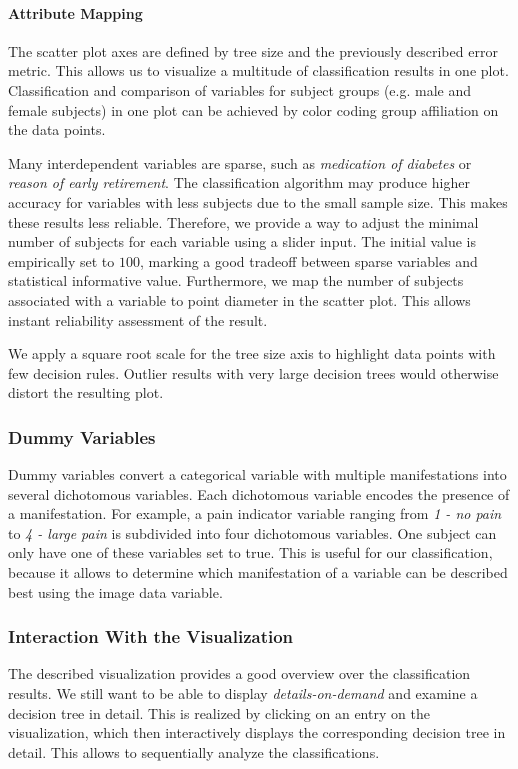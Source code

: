 \documentclass[a4paper,twoside]{style/article}
\begin{document}
\paragraph{Attribute Mapping}
The scatter plot axes are defined by tree size and the previously described error metric.
This allows us to visualize a multitude of classification results in one plot.
Classification and comparison of variables for subject groups (e.g. male and female subjects) in one plot can be achieved by color coding group affiliation on the data points.

Many interdependent variables are sparse, such as \emph{medication of diabetes} or \emph{reason of early retirement}.
The classification algorithm may produce higher accuracy for variables with less subjects due to the small sample size.
This makes these results less reliable.
Therefore, we provide a way to adjust the minimal number of subjects for each variable using a slider input.
The initial value is empirically set to $100$, marking a good tradeoff between sparse variables and statistical informative value.
Furthermore, we map the number of subjects associated with a variable to point diameter in the scatter plot.
This allows instant reliability assessment of the result.

We apply a square root scale for the tree size axis to highlight data points with few decision rules.
Outlier results with very large decision trees would otherwise distort the resulting plot.
\subsubsection{Dummy Variables}
Dummy variables convert a categorical variable with multiple manifestations into several dichotomous variables.
Each dichotomous variable encodes the presence of a manifestation.
For example, a pain indicator variable ranging from \emph{1 - no pain} to \emph{4 - large pain} is subdivided into four dichotomous variables.
One subject can only have one of these variables set to true.
This is useful for our classification, because it allows to determine which manifestation of a variable can be described best using the image data variable.
\subsubsection{Interaction With the Visualization}
The described visualization provides a good overview over the classification results.
We still want to be able to display \emph{details-on-demand} \cite{shneiderman1996} and examine a decision tree in detail.
This is realized by clicking on an entry on the visualization, which then interactively displays the corresponding decision tree in detail.
This allows to sequentially analyze the classifications.
\end{document}
